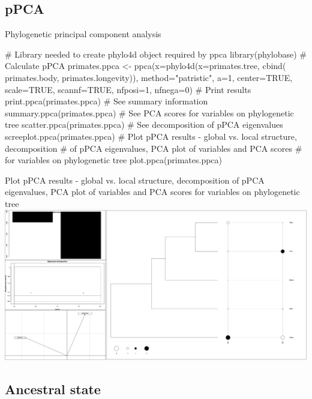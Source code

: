 \documentclass[compress, ucs, xelatex, 11pt, xcolor=svgnames,
  hyperref={
    bookmarks=true,
    unicode=true,
    colorlinks=true,
    pdftitle={Molecular data in R},
    plainpages=false,
    pdfauthor={Vojtech Zeisek},
    pdfsubject={Course about phylogeny and evolution in R},
    pdfcreator={XeLaTeX},
    pdfkeywords={R, evolution, phylogeny, molecular data},
    linkcolor=Tomato,
    anchorcolor=SaddleBrown,
    citecolor=Goldenrod,
    filecolor=DarkMagenta,
    menucolor=Sienna,
    urlcolor=DarkTurquoise,
    pdftex},
  url={hyphens, lowtilde} %
  ]{beamer}
\begin{document}
\subsection{pPCA}

\begin{frame}[fragile]{Phylogenetic principal component analysis}
  \begin{spluscode}
    # Library needed to create phylo4d object required by ppca
    library(phylobase)
    # Calculate pPCA
    primates.ppca <- ppca(x=phylo4d(x=primates.tree, cbind(
      primates.body, primates.longevity)), method="patristic",
      a=1, center=TRUE, scale=TRUE, scannf=TRUE, nfposi=1, nfnega=0)
    # Print results
    print.ppca(primates.ppca)
    # See summary information
    summary.ppca(primates.ppca)
    # See PCA scores for variables on phylogenetic tree
    scatter.ppca(primates.ppca)
    # See decomposition of pPCA eigenvalues
    screeplot.ppca(primates.ppca)
    # Plot pPCA results - global vs. local structure, decomposition
    # of pPCA eigenvalues, PCA plot of variables and PCA scores
    # for variables on phylogenetic tree
    plot.ppca(primates.ppca)
  \end{spluscode}
\end{frame}

\begin{frame}{Plot pPCA results - global vs. local structure, decomposition of pPCA eigenvalues, PCA plot of variables and PCA scores for variables on phylogenetic tree}
\includegraphics[width=\textwidth]{ppca.png}
\end{frame}

\subsection{Ancestral state}
\end{document}
